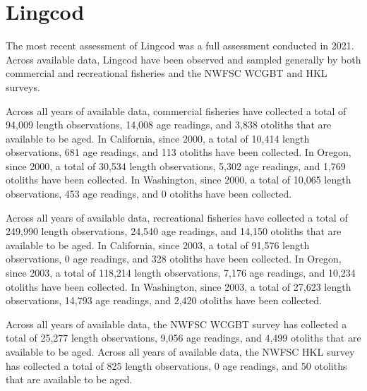 \documentclass[11pt,
  english,
  letterpaper,
]{article}
\begin{document}
\hypertarget{lingcod}{%
\section{Lingcod}\label{lingcod}}

\leavevmode\tagmcend\tagstructend


The most recent assessment of Lingcod was a full assessment conducted in 2021. Across available data, Lingcod have been observed and sampled generally by both commercial and recreational fisheries and the NWFSC WCGBT and HKL surveys.

\leavevmode\tagmcend\tagstructend\par


Across all years of available data, commercial fisheries have collected a total of 94,009 length observations, 14,008 age readings, and 3,838 otoliths that are available to be aged. In California, since 2000, a total of 10,414 length observations, 681 age readings, and 113 otoliths have been collected. In Oregon, since 2000, a total of 30,534 length observations, 5,302 age readings, and 1,769 otoliths have been collected. In Washington, since 2000, a total of 10,065 length observations, 453 age readings, and 0 otoliths have been collected.

\leavevmode\tagmcend\tagstructend\par


Across all years of available data, recreational fisheries have collected a total of 249,990 length observations, 24,540 age readings, and 14,150 otoliths that are available to be aged. In California, since 2003, a total of 91,576 length observations, 0 age readings, and 328 otoliths have been collected. In Oregon, since 2003, a total of 118,214 length observations, 7,176 age readings, and 10,234 otoliths have been collected. In Washington, since 2003, a total of 27,623 length observations, 14,793 age readings, and 2,420 otoliths have been collected.

\leavevmode\tagmcend\tagstructend\par


Across all years of available data, the NWFSC WCGBT survey has collected a total of 25,277 length observations, 9,056 age readings, and 4,499 otoliths that are available to be aged. Across all years of available data, the NWFSC HKL survey has collected a total of 825 length observations, 0 age readings, and 50 otoliths that are available to be aged.
\end{document}
